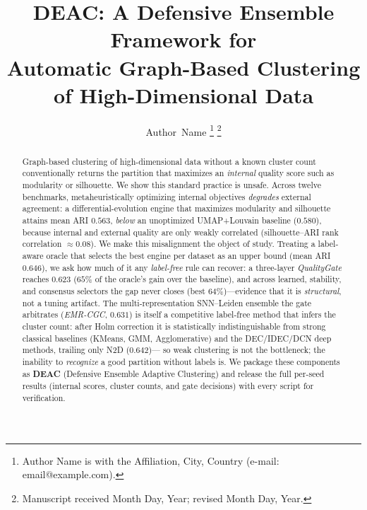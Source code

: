 \documentclass[journal]{IEEEtran}
\begin{document}
\title{DEAC: A Defensive Ensemble Framework for\\Automatic Graph-Based Clustering of High-Dimensional Data}

\author{Author~Name%
\thanks{Author Name is with the Affiliation, City, Country
(e-mail: email@example.com).}%
\thanks{Manuscript received Month Day, Year; revised Month Day, Year.}}

\maketitle

\begin{abstract}
Graph-based clustering of high-dimensional data without a known cluster count
conventionally returns the partition that maximizes an \emph{internal} quality
score such as modularity or silhouette. We show this standard practice is
unsafe. Across twelve benchmarks, metaheuristically optimizing internal
objectives \emph{degrades} external agreement: a differential-evolution engine
that maximizes modularity and silhouette attains mean ARI $0.563$, \emph{below}
an unoptimized UMAP+Louvain baseline ($0.580$), because internal and external
quality are only weakly correlated (silhouette--ARI rank correlation
${\approx}0.08$). We make this misalignment the object of study. Treating a
label-aware oracle that selects the best engine per dataset as an upper bound
(mean ARI $0.646$), we ask how much of it any \emph{label-free} rule can
recover: a three-layer \emph{QualityGate} reaches $0.623$ ($65\%$ of the
oracle's gain over the baseline), and across learned, stability, and consensus
selectors the gap never closes (best $64\%$)---evidence that it is
\emph{structural}, not a tuning artifact. The multi-representation SNN--Leiden
ensemble the gate arbitrates (\emph{EMR-CGC}, $0.631$) is itself a competitive
label-free method that infers the cluster count: after Holm correction it is
statistically indistinguishable from strong classical baselines (KMeans, GMM,
Agglomerative) and the DEC/IDEC/DCN deep methods, trailing only N2D ($0.642$)---
so weak clustering is not the bottleneck; the inability to \emph{recognize} a
good partition without labels is. We package these components as \textbf{DEAC}
(Defensive Ensemble Adaptive Clustering) and release the full per-seed results
(internal scores, cluster counts, and gate decisions) with every script for verification.
\end{abstract}
\end{document}
